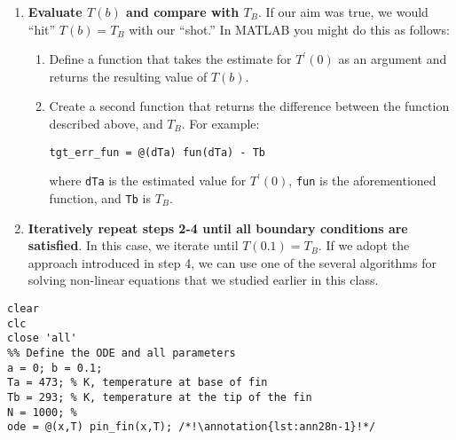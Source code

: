 \begin{enumerate}
\item \textbf{Evaluate $T(b)$ and compare with $T_B$}.  If our aim was true, we would ``hit'' $T(b)=T_B$ with our ``shot.''  In MATLAB you might do this as follows:

\begin{enumerate}
\item Define a function that takes the estimate for $T^{\prime}(0)$ as an argument and returns the resulting value of $T(b)$.
\item Create a second function that returns the difference between the function described above, and $T_B$.  For example:
\begin{lstlisting}[style=myMatlab]
tgt_err_fun = @(dTa) fun(dTa) - Tb
\end{lstlisting}
where \lstinline[style=myMatlab]{dTa} is the estimated value for $T^{\prime}(0)$, \lstinline[style=myMatlab]{fun} is the aforementioned function, and \lstinline[style=myMatlab]{Tb} is $T_B$.
\end{enumerate}

\item \textbf{Iteratively repeat steps 2-4 until all boundary conditions are satisfied}.  In this case, we iterate until $T(0.1) = T_B$. If we adopt the approach introduced in step 4, we can use one of the several algorithms for solving non-linear equations that we studied earlier in this class.   

\end{enumerate}


\begin{lstlisting}[style=myMatlab,name=lec28n-ex1]
%% Lecture 28 - Solving BVPs with the Shooting Method
clear
clc
close 'all'
%% Define the ODE and all parameters
a = 0; b = 0.1;
Ta = 473; % K, temperature at base of fin
Tb = 293; % K, temperature at the tip of the fin
N = 1000; %
ode = @(x,T) pin_fin(x,T); /*!\annotation{lst:ann28n-1}!*/
\end{lstlisting}


